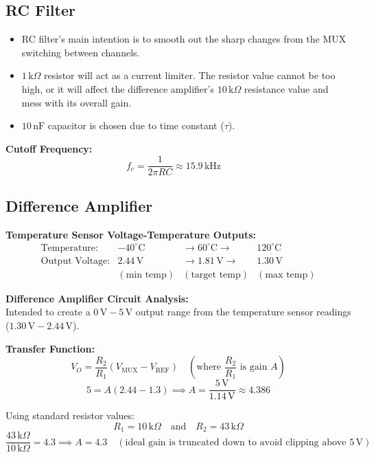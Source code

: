 \documentclass{article}
\begin{document}
\subsection{RC Filter}
\begin{itemize}
    \item RC filter's main intention is to smooth out the sharp changes from the MUX switching between channels.
    \item $1\,\text{k}\Omega$ resistor will act as a current limiter. The resistor value cannot be too high, or it will affect the difference amplifier's $10\,\text{k}\Omega$ resistance value and mess with its overall gain. 
    \item $10\,\text{nF}$ capacitor is chosen due to time constant ($\tau$).
\end{itemize}
\textbf{Cutoff Frequency:}
\[
f_c = \frac{1}{2\pi R C} \approx 15.9\,\text{kHz} \quad 
\]

\subsection{Difference Amplifier}
\textbf{Temperature Sensor Voltage-Temperature Outputs:}
\[
\begin{array}{rccc}
\text{Temperature:} & -40^\circ\text{C} & \longrightarrow 60^\circ\text{C} \longrightarrow & 120^\circ\text{C} \\
\text{Output Voltage:} & 2.44\,\text{V} & \longrightarrow 1.81\,\text{V} \longrightarrow & 1.30\,\text{V} \\
& (\text{min temp}) & (\text{target temp}) & (\text{max temp})
\end{array}
\]

\vspace{0.5em}
\noindent \textbf{Difference Amplifier Circuit Analysis:} \\
Intended to create a $0\,\text{V} - 5\,\text{V}$ output range from the temperature sensor readings ($1.30\,\text{V} - 2.44\,\text{V}$).

\noindent \textbf{Transfer Function:}
\[
V_O = \frac{R_2}{R_1} (V_{\text{MUX}} - V_{\text{REF}}) \quad \left(\text{where } \frac{R_2}{R_1} \text{ is gain } A\right)
\]
\[
5 = A(2.44 - 1.3) \implies A = \frac{5\,\text{V}}{1.14\,\text{V}} \approx 4.386
\]

\noindent Using standard resistor values:
\[
R_1 = 10\,\text{k}\Omega \quad \text{and} \quad R_2 = 43\,\text{k}\Omega
\]
\[
\frac{43\,\text{k}\Omega}{10\,\text{k}\Omega} = 4.3 \implies A = 4.3 \quad (\text{ideal gain is truncated down to avoid clipping above } 5\,\text{V})
\]
\end{document}
